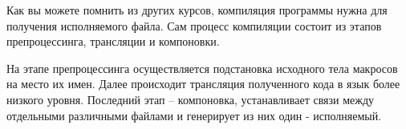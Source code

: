 Как вы можете помнить из других курсов, компиляция программы нужна для получения исполняемого файла. Сам процесс компиляции состоит из этапов препроцессинга, трансляции и компоновки.

На этапе препроцессинга осуществляется подстановка исходного тела макросов на место их имен. Далее происходит трансляция полученного кода в язык более низкого уровня. Последний этап	 -- компоновка, устанавливает связи между отдельными различными файлами и генерирует из них один - исполняемый.